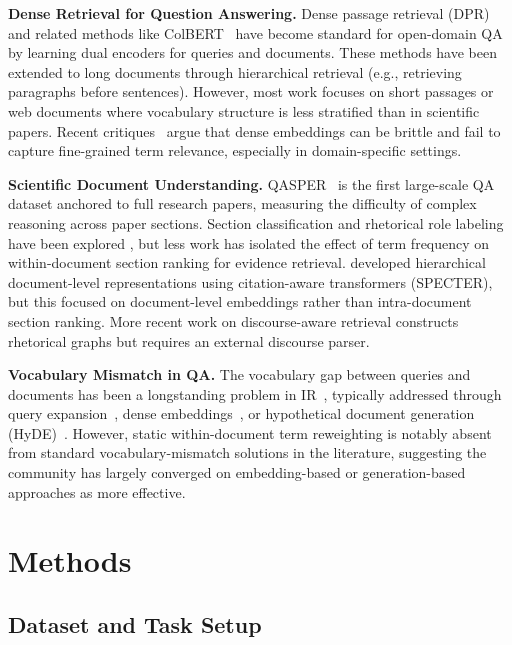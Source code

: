 \documentclass[11pt,letterpaper]{article}
\begin{document}
\textbf{Dense Retrieval for Question Answering.}
Dense passage retrieval (DPR)~\citep{Karpukhin2020} and related methods like
ColBERT~\citep{Khattab2020} have become standard for open-domain QA by learning
dual encoders for queries and documents. These methods have been extended to long
documents through hierarchical retrieval (e.g., retrieving paragraphs before
sentences). However, most work focuses on short passages or web documents where
vocabulary structure is less stratified than in scientific papers. Recent
critiques~\citep{Reichman2024} argue that dense embeddings can be brittle and fail
to capture fine-grained term relevance, especially in domain-specific settings.

\textbf{Scientific Document Understanding.}
QASPER~\citep{Dasigi2021} is the first large-scale QA dataset anchored to full
research papers, measuring the difficulty of complex reasoning across paper
sections. Section classification and rhetorical role labeling have been explored
\citep{Cohan2019}, but less work has isolated the effect of term frequency on
within-document section ranking for evidence retrieval. \citet{Cohan2020} developed
hierarchical document-level representations using citation-aware transformers
(SPECTER), but this focused on document-level embeddings rather than
intra-document section ranking. More recent work on discourse-aware retrieval
\citep{Wang2025} constructs rhetorical graphs but requires an external discourse
parser.

\textbf{Vocabulary Mismatch in QA.}
The vocabulary gap between queries and documents has been a longstanding problem
in IR~\citep{Croft2015}, typically addressed through query
expansion~\citep{Grefenstette1994}, dense embeddings~\citep{Karpukhin2020}, or
hypothetical document generation (HyDE)~\citep{Gao2022}. However, static
within-document term reweighting is notably absent from standard
vocabulary-mismatch solutions in the literature, suggesting the community has
largely converged on embedding-based or generation-based approaches as more
effective.

\section{Methods}

\subsection{Dataset and Task Setup}
\end{document}
